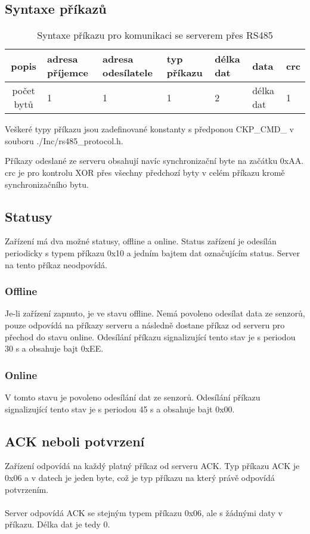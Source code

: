 \subsection{Syntaxe příkazů}

\begin{table}[!h]
    \centering
\begin{tabular}{ |c|| p{1.5cm} | p{1.5cm} | p{1cm} | p{1cm} | p{1cm} | p{1cm} | }
 \hline
 popis      & adresa příjemce & adresa odesílatele & typ příkazu & délka dat & data & crc\\ \hline
 počet bytů & 1               & 1   & 1     & 2     & délka dat     & 1 \\ 
 \hline
\end{tabular}
    \caption{Syntaxe příkazu pro komunikaci se serverem přes RS485}
    \label{table:1}
\end{table}

Veškeré typy příkazu jsou zadefinované konstanty s předponou CKP\_CMD\_ v souboru ./Inc/rs485\_protocol.h.

Příkazy odeslané ze serveru obsahují navíc synchronizační byte na začátku 0xAA.
crc je pro kontrolu XOR přes všechny předchozí byty v celém příkazu kromě synchronizačního bytu.



\subsection{Statusy}
Zařízení má dva možné statusy, offline a online. Status zařízení je odesílán periodicky s typem příkazu 0x10 a jedním bajtem dat označujícím status. Server na tento příkaz neodpovídá.

\subsubsection{Offline}
Je-li zařízení zapnuto, je ve stavu offline. Nemá povoleno odesílat data ze senzorů, pouze odpovídá na příkazy serveru a následně dostane příkaz od serveru pro přechod do stavu online. Odesílání příkazu signalizující tento stav je s periodou 30 s a obsahuje bajt 0xEE.

\subsubsection{Online}
V tomto stavu je povoleno odesílání dat ze senzorů. Odesílání příkazu signalizující tento stav je s periodou 45 s a obsahuje bajt 0x00.

\subsection{ACK neboli potvrzení}
Zařízení odpovídá na každý platný příkaz od serveru ACK. Typ příkazu ACK je 0x06 a v datech je jeden byte, což je typ příkazu na který právě odpovídá potvrzením.
\\ \\
Server odpovídá ACK se stejným typem příkazu 0x06, ale s žádnými daty v příkazu. Délka dat je tedy 0.

